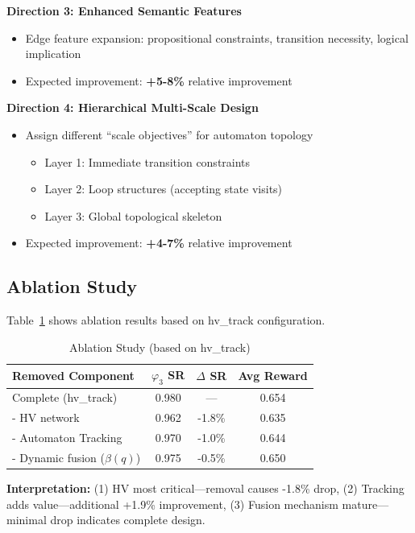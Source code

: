 \documentclass[conference]{IEEEtran}
\begin{document}
\textbf{Direction 3: Enhanced Semantic Features}
\begin{itemize}
    \item Edge feature expansion: propositional constraints, transition necessity, logical implication
    \item Expected improvement: \textbf{+5-8\%} relative improvement
\end{itemize}

\textbf{Direction 4: Hierarchical Multi-Scale Design}
\begin{itemize}
    \item Assign different ``scale objectives'' for automaton topology
    \begin{itemize}
        \item Layer 1: Immediate transition constraints
        \item Layer 2: Loop structures (accepting state visits)
        \item Layer 3: Global topological skeleton
    \end{itemize}
    \item Expected improvement: \textbf{+4-7\%} relative improvement
\end{itemize}

\subsection{Ablation Study}

Table~\ref{tab:ablation} shows ablation results based on hv\_track configuration.

\begin{table}[t]
\centering
\caption{Ablation Study (based on hv\_track)}
\label{tab:ablation}
\begin{tabular}{@{}lccc@{}}
\toprule
\textbf{Removed Component} & \textbf{$\varphi_3$ SR} & \textbf{$\Delta$ SR} & \textbf{Avg Reward} \\ \midrule
Complete (hv\_track) & 0.980 & --- & 0.654 \\
- HV network & 0.962 & -1.8\% & 0.635 \\
- Automaton Tracking & 0.970 & -1.0\% & 0.644 \\
- Dynamic fusion ($\beta(q)$) & 0.975 & -0.5\% & 0.650 \\ \bottomrule
\end{tabular}
\end{table}

\textbf{Interpretation:} (1) HV most critical---removal causes -1.8\% drop, (2) Tracking adds value---additional +1.9\% improvement, (3) Fusion mechanism mature---minimal drop indicates complete design.
\end{document}
